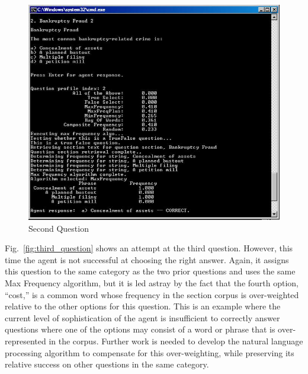 \begin{figure}
\centering
\includegraphics[scale=0.75]{screen_shot_5.jpg}
\caption{Second Question}
\label{fig:second_question}
\end{figure}

Fig.~\ref{fig:third_question} shows an attempt at the third question.  However, this time the agent is not successful at choosing the right answer.  Again, it assigns this question to the same category as the two prior questions and uses the same Max Frequency algorithm, but it is led astray by the fact that the fourth option, ``cost,'' is a common word whose frequency in the section corpus is over-weighted relative to the other options for this question.  This is an example where the current level of sophistication of the agent is insufficient to correctly answer questions where one of the options may consist of a word or phrase that is over-represented in the corpus.  Further work is needed to develop the natural language processing algorithm to compensate for this over-weighting, while preserving its relative success on other questions in the same category.

